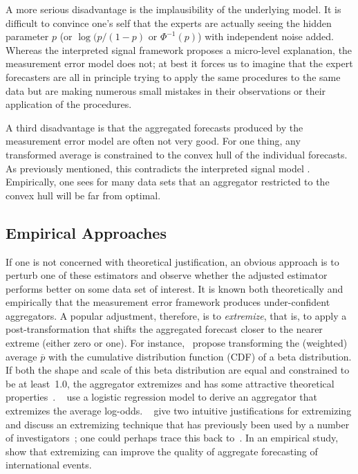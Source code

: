 \documentclass[11pt]{article}
\theoremstyle{definition}
\theoremstyle{definition}
\def\pb{\overline{p}}
\begin{document}
A more serious disadvantage is the implausibility of the underlying 
model.  It is difficult to convince one's self that the experts
are actually seeing the hidden parameter $p$ (or $\log(p/(1-p)$ 
or $\Phi^{-1} (p)$) with independent noise added.  Whereas the
interpreted signal framework proposes a micro-level explanation,
the measurement error model does not; at best it forces us to 
imagine that the expert forecasters are all in principle trying
to apply the same procedures to the same data but are making
numerous small mistakes in their observations or their application 
of the procedures.  

A third disadvantage is that the aggregated forecasts produced by
the measurement error model are often not very good.  For one thing,
any transformed average is constrained to the convex hull of the
individual forecasts.  As previously mentioned, this contradicts the 
interpreted signal model \citep{parunak2013characterizing}.  Empirically, one sees for many data 
sets that an aggregator restricted to the convex hull will be far 
from optimal.  

\subsection{Empirical Approaches}
\label{ss:empirical}

If one is not concerned with theoretical justification, an obvious
approach is to perturb one of these estimators and observe 
whether the adjusted estimator performs better on some data set
of interest.  It is known both theoretically and empirically
that the measurement error framework produces under-confident 
aggregators.  A popular adjustment, therefore, is to {\em extremize},
that is, to apply a post-transformation that shifts the 
aggregated forecast closer to the nearer extreme (either zero or one).
For instance,~\citet{Ranjan08} propose transforming
the (weighted) average $\pb$ with the cumulative distribution function
(CDF) of a beta distribution.  If both the shape and scale of this 
beta distribution are equal and constrained to be at least~1.0,
the aggregator extremizes and has some attractive theoretical
properties~\citep{Wallsten2001}.  ~\citet{satopaa}
use a logistic regression model to derive an aggregator that extremizes
the average log-odds.  ~\citet{baron2014two} give two intuitive
justifications for extremizing and discuss an extremizing technique
that has previously been used by a number of investigators~\citep{Erev1994,
shlomi2010subjective}; one could perhaps trace this back
to~\citet{karmarkar1978subjectively}.  
In an empirical study,~\citet{mellers2014psychological} show that 
extremizing can improve the quality of aggregate forecasting of 
international events.  
\end{document}
